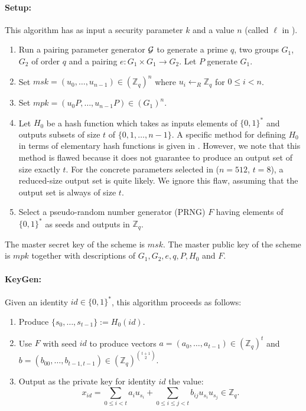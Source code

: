 \documentclass{llncs}
\newcommand{\ring}[1]{\mathbb{#1}}
\newcommand{\Z}{\ensuremath{\ring{Z}}\xspace}
\begin{document}
\paragraph{Setup:} This algorithm has as input a security parameter $k$ and a value $n$ (called $\ell$ in \cite{CCGHC10}).
\begin{enumerate}
\item Run a pairing parameter generator ${\cal G}$ to generate a prime $q$, two groups $G_1$, $G_2$ of order $q$ and a pairing $e: G_1 \times G_1 \rightarrow G_2$. Let $P$ generate $G_1$.

\item Set $msk=(u_0,\ldots,u_{n-1}) \in (\Z_q)^n$ where $u_i \leftarrow_R \Z_q$ for $0 \le i < n$.

\item Set $mpk = (u_0P,\ldots,u_{n-1}P) \in (G_1)^n$.

\item Let $H_0$ be a hash function which takes as inputs elements of $\{0,1\}^*$ and outputs subsets of size $t$ of $\{0,1,\ldots,n-1\}$. A specific method for defining $H_0$ in terms of elementary hash functions is given in \cite{CCGHC10}. However, we note that this method is flawed because it does not guarantee to produce an output set of size exactly $t$. For the concrete parameters selected in \cite{CCGHC10} ($n=512$, $t=8$), a reduced-size output set is quite likely. We ignore this flaw, assuming that the output set is always of size $t$.

\item Select a pseudo-random number generator (PRNG) $F$ having elements of $\{0,1\}^*$ as seeds and outputs in $\Z_q$.

\end{enumerate}

The master secret key of the scheme is $msk$. The master public key of the scheme is $mpk$ together with descriptions of $G_1,G_2,e,q,P,H_0$ and $F$.

\paragraph{KeyGen:} Given an identity $id \in \{0,1\}^*$, this algorithm proceeds as follows:
\begin{enumerate}
\item Produce $\{s_0,\ldots,s_{t-1}\} := H_0(id)$.

\item Use $F$ with seed $id$ to produce vectors $a=(a_0,\ldots,a_{t-1}) \in (\Z_q)^t$ and $b=(b_{00},\ldots,b_{t-1,t-1}) \in (\Z_q)^{{t + 1\choose 2}}$.

\item Output as the private key for identity $id$ the value:
\[
x_{id}= \sum_{0 \le i < t}a_iu_{s_i} + \sum_{0 \le i \le j < t} b_{ij}u_{s_i}u_{s_j} \in \Z_q .
\]
\end{enumerate}
\end{document}
